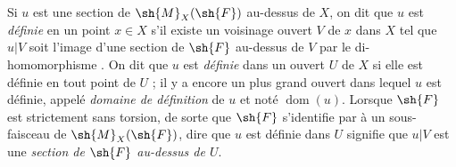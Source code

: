 \begin{env}[20.1.7]
Si $u$ est une section de $\sh{M}_X(\sh{F})$ au-dessus de $X$, on dit que $u$ est \emph{définie} en un point $x\in X$ s'il existe un voisinage ouvert $V$ de $x$ dans $X$ tel que $u|V$ soit l'image d'une section de $\sh{F}$ au-dessus de $V$ par le di-homomorphisme .
On dit que $u$ est \emph{définie} dans un ouvert $U$ de $X$ si elle est définie en tout point de $U$ ; il y a encore un plus grand ouvert dans lequel $u$ est définie, appelé \emph{domaine de définition} de $u$ et noté $\operatorname{dom}(u)$.
Lorsque $\sh{F}$ est strictement sans torsion, de sorte que $\sh{F}$ s'identifie par  à un sous-faisceau de $\sh{M}_X(\sh{F})$, dire que $u$ est définie dans $U$ signifie que $u|V$ est une \emph{section de $\sh{F}$ au-dessus de $U$}.
\end{env}

